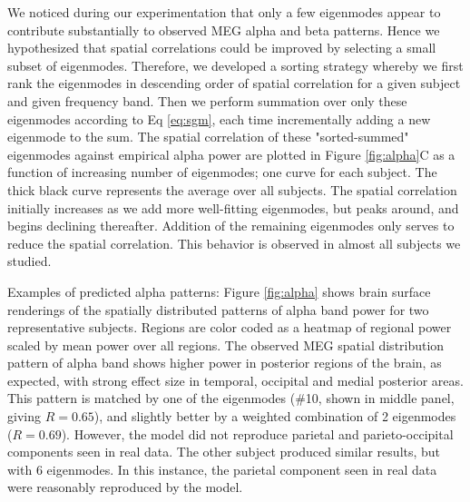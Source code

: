 We noticed during our experimentation that only a few eigenmodes appear
to contribute substantially to observed MEG alpha and beta patterns.
Hence we hypothesized that spatial correlations could be improved by
selecting a small subset of eigenmodes. Therefore, we developed a
sorting strategy whereby we first rank the eigenmodes in descending
order of spatial correlation for a given subject and given frequency
band. Then we perform summation over only these eigenmodes according to
Eq \ref{eq:sgm}, each time incrementally adding a new eigenmode to the sum. The
spatial correlation of these "sorted-summed" eigenmodes against
empirical alpha power are plotted in Figure \ref{fig:alpha}C as a function of
increasing number of eigenmodes; one curve for each subject. The thick
black curve represents the average over all subjects. The spatial
correlation initially increases as we add more well-fitting eigenmodes,
but peaks around, and begins declining thereafter. Addition of the
remaining eigenmodes only serves to reduce the spatial correlation. This
behavior is observed in almost all subjects we studied.

Examples of predicted alpha patterns: Figure \ref{fig:alpha} shows brain
surface renderings of the spatially distributed patterns of alpha band
power for two representative subjects. Regions are color coded as a
heatmap of regional power scaled by mean power over all regions. The
observed MEG spatial distribution pattern of alpha band shows higher
power in posterior regions of the brain, as expected, with strong effect
size in temporal, occipital and medial posterior areas. This pattern is
matched by one of the eigenmodes (\#10, shown in middle panel, giving
$R=0.65$), and slightly better by a weighted combination of 2 eigenmodes
($R=0.69$). However, the model did not reproduce parietal and
parieto-occipital components seen in real data. The other subject
produced similar results, but with 6 eigenmodes. In this instance, the
parietal component seen in real data were reasonably reproduced by the
model.

